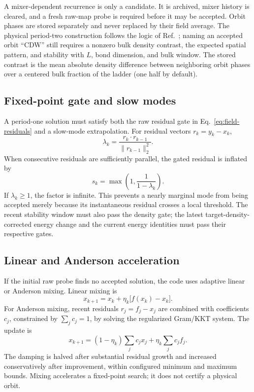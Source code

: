 \documentclass[11pt]{article}
\begin{document}
A mixer-dependent recurrence is only a candidate.  It is archived, mixer
history is cleared, and a fresh raw-map probe is required before it may be
accepted.  Orbit phases are stored separately and never replaced by their
field average.  The physical period-two construction follows the logic of
Ref.~\cite{bollmark2025}; naming an accepted orbit ``CDW'' still requires a
nonzero bulk density contrast, the expected spatial pattern, and stability
with \(L\), bond dimension, and bulk window.  The stored contrast is the mean
absolute density difference between neighboring orbit phases over a centered
bulk fraction of the ladder (one half by default).

\subsection{Fixed-point gate and slow modes}

A period-one solution must satisfy both the raw residual gate in
Eq.~\eqref{eq:field-residuals} and a slow-mode extrapolation.  For residual
vectors \(r_k=y_k-x_k\),
\begin{equation}
 \lambda_k=\frac{r_k\cdot r_{k-1}}{\|r_{k-1}\|_2^2}.
\end{equation}
When consecutive residuals are sufficiently parallel, the gated residual is
inflated by
\begin{equation}
  s_k=\max\left(1,\frac{1}{1-\lambda_k}\right).
\end{equation}
If \(\lambda_k\ge1\), the factor is infinite.  This prevents a nearly marginal
mode from being accepted merely because its instantaneous residual crosses a
local threshold.  The recent stability window must also pass the density gate;
the latest target-density-corrected energy change and the current energy
identities must pass their respective gates.

\subsection{Linear and Anderson acceleration}

If the initial raw probe finds no accepted solution, the code uses adaptive
linear or Anderson mixing.  Linear mixing is
\begin{equation}
 x_{k+1}=x_k+\eta_k\bigl[f(x_k)-x_k\bigr].
\end{equation}
For Anderson mixing, recent residuals \(r_j=f_j-x_j\) are combined with
coefficients \(c_j\), constrained by \(\sum_jc_j=1\), by solving the regularized
Gram/KKT system.  The update is
\begin{equation}
 x_{k+1}=(1-\eta_k)\sum_jc_jx_j+\eta_k\sum_jc_jf_j.
\end{equation}
The damping is halved after substantial residual growth and increased
conservatively after improvement, within configured minimum and maximum
bounds.  Mixing accelerates a fixed-point search; it does not certify a
physical orbit.
\end{document}
